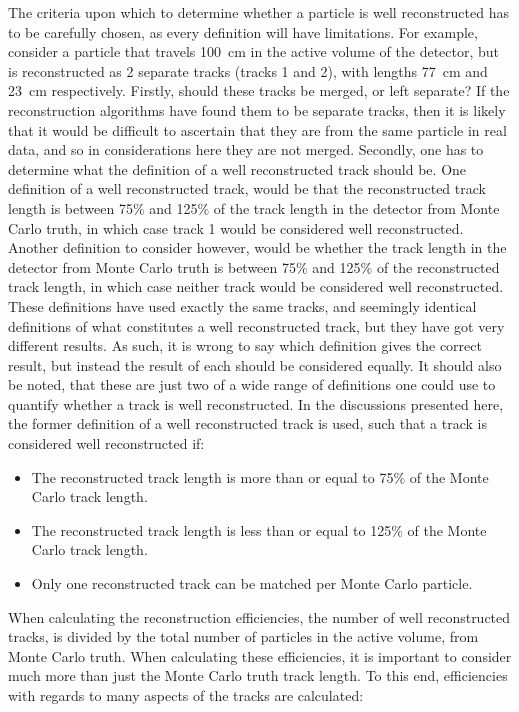 The criteria upon which to determine whether a particle is well reconstructed has to be carefully chosen, as every definition will have limitations. For example, consider a particle that travels 100~cm in the active volume of the detector, but is reconstructed as 2 separate tracks (tracks 1 and 2), with lengths 77~cm and 23~cm respectively. Firstly, should these tracks be merged, or left separate? If the reconstruction algorithms have found them to be separate tracks, then it is likely that it would be difficult to ascertain that they are from the same particle in real data, and so in considerations here they are not merged. Secondly, one has to determine what the definition of a well reconstructed track should be. One definition of a well reconstructed track, would be that the reconstructed track length is between 75$\%$ and 125$\%$ of the track length in the detector from Monte Carlo truth, in which case track 1 would be considered well reconstructed. Another definition to consider however, would be whether the track length in the detector from Monte Carlo truth is between 75$\%$ and 125$\%$ of the reconstructed track length, in which case neither track would be considered well reconstructed. These definitions have used exactly the same tracks, and seemingly identical definitions of what constitutes a well reconstructed track, but they have got very different results. As such, it is wrong to say which definition gives the correct result, but instead the result of each should be considered equally. It should also be noted, that these are just two of a wide range of definitions one could use to quantify whether a track is well reconstructed. In the discussions presented here, the former definition of a well reconstructed track is used, such that a track is considered well reconstructed if:
\begin{itemize}
\item The reconstructed track length is more than or equal to 75$\%$ of the Monte Carlo track length.
\item The reconstructed track length is less than or equal to 125$\%$ of the Monte Carlo track length.
\item Only one reconstructed track can be matched per Monte Carlo particle.
\end{itemize}
When calculating the reconstruction efficiencies, the number of well reconstructed tracks, is divided by the total number of particles in the active volume, from Monte Carlo truth. When calculating these efficiencies, it is important to consider much more than just the Monte Carlo truth track length. To this end, efficiencies with regards to many aspects of the tracks are calculated:
